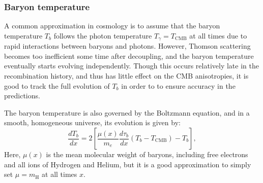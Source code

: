 \documentclass{aa}
\numberwithin{equation}{section}
\numberwithin{table}{section}
\numberwithin{figure}{section}
\begin{document}







\subsubsection{Baryon temperature}\label{subsubsec: II theory baryon temp}
A common approximation in cosmology is to assume that the baryon temperature $T_b$ follows the photon temperature $T_\gamma=T_\text{CMB}$ at all times due to rapid interactions between baryons and photons. However, Thomson scattering becomes too inefficient some time after decoupling, and the baryon temperature eventually starts evolving independently. Though this occurs relatively late in the recombination history, and thus has little effect on the CMB anisotropies, it is good to track the full evolution of $T_b$ in order to to ensure accuracy in the predictions. 

The baryon temperature is also governed by the Boltzmann equation, and in a smooth, homogeneous universe, its evolution is given by:
\begin{equation}
\frac{dT_b}{dx} = 2\left[\frac{\mu(x)}{m_e}\frac{d\tau_b}{dx}(T_b -T_\text{CMB}) - T_b \right], \label{eq: dTbdx}
\end{equation}
Here, $\mu(x)$ is the mean molecular weight of baryons, including free electrons and all ions of Hydrogen and Helium, but it is a good approximation to simply set $\mu = m_\text{H}$ at all times $x$. 
\end{document}
